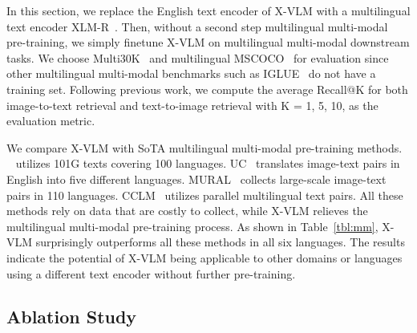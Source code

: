 \documentclass{article}
\newcommand{\baby}{X-VLM\xspace}
\begin{document}
In this section, we replace the English text encoder of \baby with a multilingual text encoder XLM-R~\cite{conneau2020unsupervised}. Then, without a second step multilingual multi-modal pre-training, we simply finetune \baby on multilingual multi-modal downstream tasks. We choose Multi30K~\cite{young2014image} and multilingual MSCOCO~\cite{chen2015microsoft, yoshikawa2017stair, li2019coco} for evaluation since other multilingual multi-modal benchmarks such as IGLUE~\cite{bugliarello2022iglue} do not have a training set. Following previous work, we compute the average Recall@K for both image-to-text retrieval and text-to-image retrieval with K = 1, 5, 10, as the evaluation metric. 


We compare \baby with SoTA multilingual multi-modal pre-training methods. ~\cite{ni2021m3p} utilizes 101G texts covering 100 languages. UC~\cite{zhou2021uc2} translates image-text pairs in English into five different languages. MURAL~\cite{jain2021mural} collects large-scale image-text pairs in 110 languages. CCLM~\cite{cclm} utilizes parallel multilingual text pairs. All these methods rely on data that are costly to collect, while \baby relieves the multilingual multi-modal pre-training process. As shown in Table~\ref{tbl:mm}, \baby surprisingly outperforms all these methods in all six languages. The results indicate the potential of \baby being applicable to other domains or languages using a different text encoder without further pre-training. 





\subsection{Ablation Study} 
\end{document}
